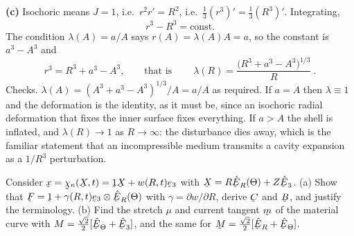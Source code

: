 \begin{solution}
\textbf{(c)} Isochoric means $J=1$, i.e.\ $r^{2}r'=R^{2}$, i.e.\
$\tfrac13(r^{3})'=\tfrac13(R^{3})'$. Integrating,
\[
   r^{3}-R^{3}=\text{const}.
\]
The condition $\lambda(A)=a/A$ says $r(A)=\lambda(A)A=a$, so the constant
is $a^{3}-A^{3}$ and
\[
   r^{3}=R^{3}+a^{3}-A^{3},
   \qquad\text{that is}\qquad
   \boxed{\ \lambda(R)=\frac{\big(R^{3}+a^{3}-A^{3}\big)^{1/3}}{R}\ }.
\]
Checks. $\lambda(A)=(A^{3}+a^{3}-A^{3})^{1/3}/A=a/A$ as required. If
$a=A$ then $\lambda\equiv1$ and the deformation is the identity, as it
must be, since an isochoric radial deformation that fixes the inner
surface fixes everything. If $a>A$ the shell is inflated, and
$\lambda(R)\to1$ as $R\to\infty$: the disturbance dies away, which is the
familiar statement that an incompressible medium transmits a cavity
expansion as a $1/R^{3}$ perturbation.
\end{solution}

\begin{problem}
Consider $\bx=\bchi_{\kappa}(\bX,t)=\shift\bX+w(R,t)\be_{3}$ with
$\bX=R\hER(\Theta)+Z\hbE_{3}$.
(a) Show that $\bF=\shift+\gamma(R,t)\be_{3}\otimes\hER(\Theta)$ with
$\gamma=\partial w/\partial R$, derive $\bC$ and $\bB$, and justify the
terminology.
(b) Find the stretch $\mu$ and current tangent $\bm$ of the material curve
with $M=\tfrac{\sqrt2}{2}[\hETh+\hbE_{3}]$, and the same for
$\bM=\tfrac{\sqrt2}{2}[\hER+\hETh]$.
\end{problem}

